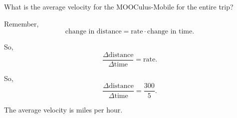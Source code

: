 \documentclass{ximera}
\begin{document}
\begin{problem}
  What is the average velocity for the MOOCulus-Mobile for the entire trip? 
\begin{hint}
  Remember, 
  \[
  \text{change in distance} = \text{rate}\cdot\text{change in time}.
  \]
\end{hint}
\begin{hint}
  So, 
  \[
  \frac{\Delta\text{distance}}{\Delta\text{time}} = \text{rate}.
  \]
\end{hint}
\begin{hint}
So, 
\[
\frac{\Delta\text{distance}}{\Delta\text{time}} = \frac{300}{5}.
\]
\end{hint}
\begin{prompt}
  The average velocity is  miles per hour.
\end{prompt}
\end{problem}


\end{document}
